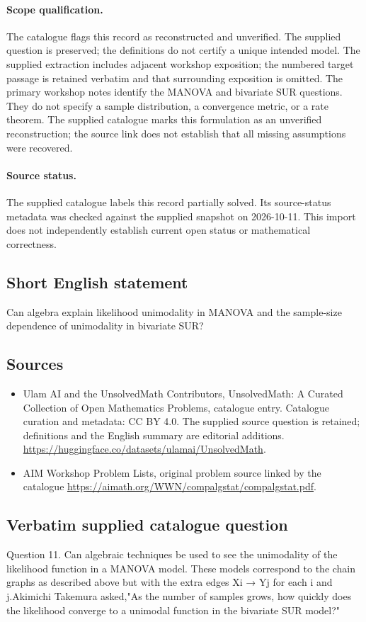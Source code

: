 \documentclass[11pt]{article}
\begin{document}
\paragraph{Scope qualification.}
The catalogue flags this record as reconstructed and unverified. The supplied question is preserved; the definitions do not certify a unique intended model. The supplied extraction includes adjacent workshop exposition; the numbered target passage is retained verbatim and that surrounding exposition is omitted. The primary workshop notes identify the MANOVA and bivariate SUR questions. They do not specify a sample distribution, a convergence metric, or a rate theorem.
The supplied catalogue marks this formulation as an unverified reconstruction; the source link does not establish that all missing assumptions were recovered.
\paragraph{Source status.}
The supplied catalogue labels this record partially solved. Its source-status metadata was checked against the supplied snapshot on 2026-10-11. This import does not independently establish current open status or mathematical correctness.
\subsection{Short English statement}
Can algebra explain likelihood unimodality in MANOVA and the sample-size dependence of unimodality in bivariate SUR?
\subsection{Sources}
\begin{itemize}
\item[S1] Ulam AI and the UnsolvedMath Contributors, UnsolvedMath: A Curated Collection of Open Mathematics Problems, catalogue entry. Catalogue curation and metadata: CC BY 4.0. The supplied source question is retained; definitions and the English summary are editorial additions.
\url{https://huggingface.co/datasets/ulamai/UnsolvedMath}.
\item[S2] AIM Workshop Problem Lists, original problem source linked by the catalogue
\url{https://aimath.org/WWN/compalgstat/compalgstat.pdf}.
\end{itemize}
\subsection{Verbatim supplied catalogue question}
Question 11. Can algebraic techniques be used to see the unimodality of the likelihood function in a MANOVA model. These models correspond to the chain graphs as described above but with the extra edges Xi → Yj for each i and j.Akimichi Takemura asked,"As the number of samples grows, how quickly does the likelihood converge to a unimodal function in the bivariate SUR model?"
\end{document}
